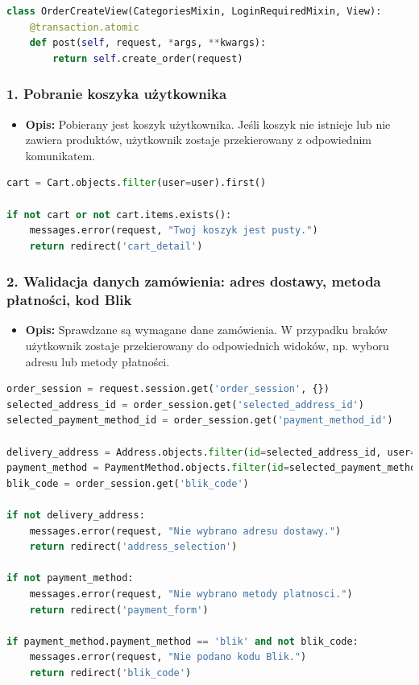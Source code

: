 \documentclass[12pt,a4paper,oneside]{article}
\theoremstyle{definition}
\numberwithin{equation}{section}
\begin{document}
\begin{lstlisting}[language=Python, caption=Metoda \texttt{post()}]
class OrderCreateView(CategoriesMixin, LoginRequiredMixin, View):
    @transaction.atomic
    def post(self, request, *args, **kwargs):
        return self.create_order(request)
\end{lstlisting}



\subsubsection*{1. Pobranie koszyka użytkownika}
\begin{itemize}
    \item \textbf{Opis:} Pobierany jest koszyk użytkownika. Jeśli koszyk nie istnieje lub nie zawiera produktów, użytkownik zostaje przekierowany z odpowiednim komunikatem.
\end{itemize}

\begin{lstlisting}[language=Python]
cart = Cart.objects.filter(user=user).first()

if not cart or not cart.items.exists():
    messages.error(request, "Twoj koszyk jest pusty.")
    return redirect('cart_detail')
\end{lstlisting}



\subsubsection*{2. Walidacja danych zamówienia: adres dostawy, metoda płatności, kod Blik}
\begin{itemize}
    \item \textbf{Opis:} Sprawdzane są wymagane dane zamówienia. W przypadku braków użytkownik zostaje przekierowany do odpowiednich widoków, np. wyboru adresu lub metody płatności.
\end{itemize}

\begin{lstlisting}[language=Python]
order_session = request.session.get('order_session', {})
selected_address_id = order_session.get('selected_address_id')
selected_payment_method_id = order_session.get('payment_method_id')

delivery_address = Address.objects.filter(id=selected_address_id, user=user).first()
payment_method = PaymentMethod.objects.filter(id=selected_payment_method_id, user=user).first()
blik_code = order_session.get('blik_code')

if not delivery_address:
    messages.error(request, "Nie wybrano adresu dostawy.")
    return redirect('address_selection')

if not payment_method:
    messages.error(request, "Nie wybrano metody platnosci.")
    return redirect('payment_form')

if payment_method.payment_method == 'blik' and not blik_code:
    messages.error(request, "Nie podano kodu Blik.")
    return redirect('blik_code')
\end{lstlisting}
\end{document}
